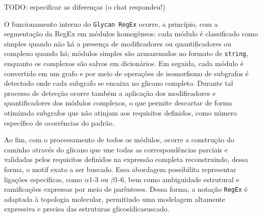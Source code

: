 TODO: especificar as diferenças (o chat respondeu!)


O funcionamento interno do \texttt{Glycan RegEx} ocorre, a princípio, com a
segmentação da RegEx em módulos homogêneos: cada módulo é classificado como
simples quando não há a presença de modificadores ou quantificadores ou
complexo quando há; módulos simples são armazenados no formato de
\texttt{string}, enquanto os complexos são salvos em dicionários. Em seguida,
cada módulo é convertido em um grafo e por meio de operações de isomorfismo de
subgrafos é detectado onde cada subgrafo se encaixa no glicano completo.
Durante tal processo de detecção ocorre também a aplicação dos modificadores e
quantificadores dos módulos complexos, o que permite descartar de forma
otimizada subgrafos que não atinjam aos requisitos definidos, como número
específico de ocorrências do padrão.

Ao fim, com o processamento de todos os módulos, ocorre a construção do caminho
através do glicano que une todas as correspondências parciais e validadas pelos
requisitos definidos na expressão completa reconstruindo, dessa forma, o motif
exato a ser buscado. Essa abordagem possibilita representar ligações
específicas, como $\alpha$1-3 ou $\beta$1-6, bem como ambiguidade estrutural e
ramificações expressas por meio de parênteses. Dessa forma, a notação
\texttt{RegEx} é adaptada à topologia molecular, permitindo uma modelagem
altamente expressiva e precisa das estruturas glicosídicasuscado.


